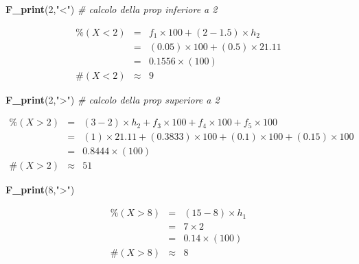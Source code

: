 \documentclass[
  11pt,
]{book}
\newenvironment{Shaded}{\begin{snugshade}}{\end{snugshade}}
\newcommand{\CommentTok}[1]{\textcolor[rgb]{0.56,0.35,0.01}{\textit{#1}}}
\newcommand{\DecValTok}[1]{\textcolor[rgb]{0.00,0.00,0.81}{#1}}
\newcommand{\FunctionTok}[1]{\textcolor[rgb]{0.13,0.29,0.53}{\textbf{#1}}}
\newcommand{\NormalTok}[1]{#1}
\newcommand{\StringTok}[1]{\textcolor[rgb]{0.31,0.60,0.02}{#1}}
\theoremstyle{mytheoremstyle}
\theoremstyle{mydefstyle}
\begin{document}
\begin{Shaded}
\begin{Highlighting}[]
\FunctionTok{F\_print}\NormalTok{(}\DecValTok{2}\NormalTok{,}\StringTok{"\textless{}"}\NormalTok{)             }\CommentTok{\# calcolo della prop inferiore a 2}
\end{Highlighting}
\end{Shaded}

\begin{eqnarray*}
     \%(X< 2 ) &=&  f_{ 1 }\times 100 +( 2 - 1.5 )\times h_{ 2 } \\
              &=&  ( 0.05 )\times 100 +( 0.5 )\times  21.11  \\
              &=&  0.1556 \times(100) \\
     \#(X< 2 ) &\approx& 9 
         \end{eqnarray*}

\begin{Shaded}
\begin{Highlighting}[]
\FunctionTok{F\_print}\NormalTok{(}\DecValTok{2}\NormalTok{,}\StringTok{"\textgreater{}"}\NormalTok{)             }\CommentTok{\# calcolo della prop superiore a 2}
\end{Highlighting}
\end{Shaded}

\begin{eqnarray*}
     \%(X> 2 ) &=& ( 3 - 2 )\times h_{ 2 }+ f_{ 3 }\times 100+f_{ 4 }\times 100+f_{ 5 }\times 100 \\
              &=& ( 1 )\times 21.11 + ( 0.3833 )\times 100+( 0.1 )\times 100+( 0.15 )\times 100 \\
              &=&  0.8444 \times(100)\\
     \#(X> 2 ) &\approx& 51 
         \end{eqnarray*}

\begin{Shaded}
\begin{Highlighting}[]
\FunctionTok{F\_print}\NormalTok{(}\DecValTok{8}\NormalTok{,}\StringTok{"\textgreater{}"}\NormalTok{)}
\end{Highlighting}
\end{Shaded}

\begin{eqnarray*}
     \%(X> 8 ) &=&( 15 - 8 )\times h_1 \\
              &=& 7 \times  2 \\
              &=&  0.14 \times(100)\\
     \#(X> 8 ) &\approx& 8 
         \end{eqnarray*}
\end{document}
